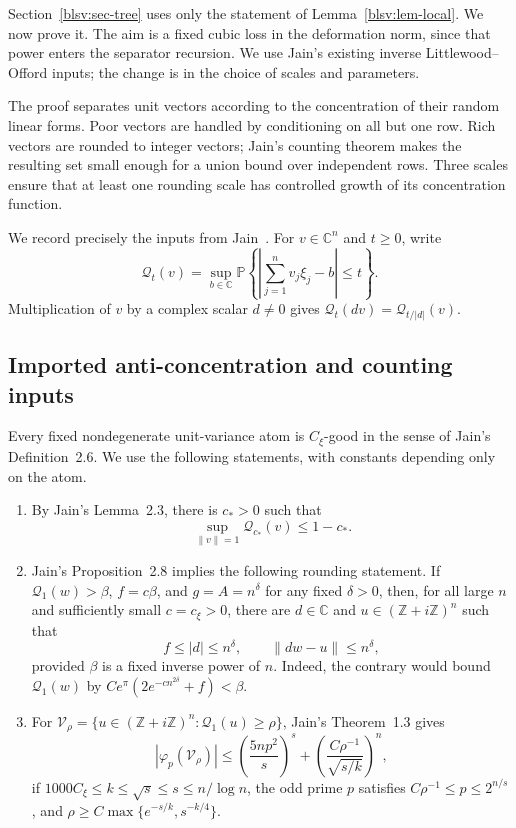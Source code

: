 \documentclass[11pt,reqno]{amsart}
\numberwithin{equation}{section}
\theoremstyle{plain}
\theoremstyle{definition}
\theoremstyle{remark}
\providecommand{\blsvP}{\mathbb P}
\providecommand{\blsvC}{\mathbb C}
\providecommand{\blsvZ}{\mathbb Z}
\providecommand{\blsvQ}{\mathcal Q}
\begin{document}
Section~\ref{blsv:sec-tree} uses only the statement of
Lemma~\ref{blsv:lem-local}. We now prove it. The aim is a fixed cubic
loss in the deformation norm, since that power enters the separator
recursion. We use Jain's existing inverse Littlewood--Offord inputs;
the change is in the choice of scales and parameters.

The proof separates unit vectors according to the concentration of
their random linear forms. Poor vectors are handled by conditioning on
all but one row. Rich vectors are rounded to integer vectors; Jain's
counting theorem makes the resulting set small enough for a union bound
over independent rows. Three scales ensure that at least one rounding
scale has controlled growth of its concentration function.

We record precisely the inputs from Jain~\cite{blsvJain}. For
$v\in\blsvC^n$ and $t\ge0$, write
\[
 \blsvQ_t(v)=\sup_{b\in\blsvC}
    \blsvP\left\{\left|\sum_{j=1}^n v_j\xi_j-b\right|\le t\right\}.
\]
Multiplication of $v$ by a complex scalar $d\ne0$ gives
$\blsvQ_t(dv)=\blsvQ_{t/|d|}(v)$.

\subsection{Imported anti-concentration and counting inputs}

Every fixed nondegenerate unit-variance atom is $C_\xi$-good in the sense
of Jain's Definition~2.6. We use the following statements, with constants
depending only on the atom.

\begin{enumerate}
\item By Jain's Lemma~2.3, there is $c_*>0$ such that
\begin{equation}\label{blsv:eq-uniform-ac}
 \sup_{\|v\|=1}\blsvQ_{c_*}(v)\le1-c_*.
\end{equation}
\item Jain's Proposition~2.8 implies the following rounding statement.
If $\blsvQ_1(w)>\beta$, $f=c\beta$, and $g=A=n^\delta$ for any fixed
$\delta>0$, then, for all large $n$ and sufficiently small $c=c_\xi>0$,
there are $d\in\blsvC$ and $u\in(\blsvZ+i\blsvZ)^n$ such that
\begin{equation}\label{blsv:eq-round-input}
 f\le|d|\le n^\delta,\qquad \|dw-u\|\le n^\delta,
\end{equation}
provided $\beta$ is a fixed inverse power of $n$. Indeed, the contrary
would bound $\blsvQ_1(w)$ by
$C e^\pi(2e^{-c n^{2\delta}}+f)<\beta$.
\item For
$\mathcal V_\rho=\{u\in(\blsvZ+i\blsvZ)^n:\blsvQ_1(u)\ge\rho\}$,
Jain's Theorem~1.3 gives
\begin{equation}\label{blsv:eq-jain-count}
 |\varphi_p(\mathcal V_\rho)|
 \le\left(\frac{5np^2}{s}\right)^s+
 \left(\frac{C\rho^{-1}}{\sqrt{s/k}}\right)^n,
\end{equation}
if $1000C_\xi\le k\le\sqrt{s}\le s\le n/\log n$, the odd prime $p$
satisfies $C\rho^{-1}\le p\le2^{n/s}$, and
$\rho\ge C\max\{e^{-s/k},s^{-k/4}\}$.
\end{enumerate}
\end{document}
